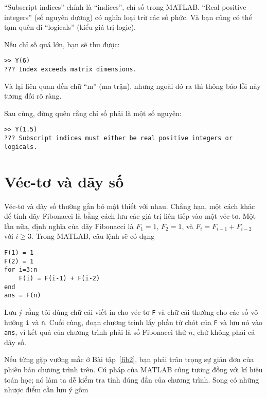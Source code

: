 \documentclass[12pt]{book}
\begin{document}
``Subscript indices'' chính là ``indices'', chỉ số trong MATLAB.
``Real positive integers'' (số nguyên dương) có nghĩa loại trừ
các số phức. Và bạn cũng có thể tạm quên đi ``logicals'' (kiểu
giá trị logic).

Nếu chỉ số quá lớn, bạn sẽ thu được:

\begin{verbatim}
>> Y(6)
??? Index exceeds matrix dimensions.
\end{verbatim}

Và lại liên quan đến chữ ``m'' (ma trận), nhưng ngoài đó ra thì
thông báo lỗi này tương đối rõ ràng.

Sau cùng, đừng quên rằng chỉ số phải là một số nguyên:

\begin{verbatim}
>> Y(1.5)
??? Subscript indices must either be real positive integers or
logicals.
\end{verbatim}


\section{Véc-tơ và dãy số}

Véc-tơ và dãy số thường gắn bó mật thiết với nhau. Chẳng hạn, một
cách khác để tính dãy Fibonacci là bằng cách lưu các giá trị liên
tiếp vào một véc-tơ. Một lần nữa, định nghĩa của dãy Fibonacci là
$F_1 = 1$, $F_2 = 1$, và $F_{i} = F_{i-1} +
F_{i-2}$ với $i \ge 3$.  Trong MATLAB, câu lệnh sẽ có dạng

\begin{verbatim}
F(1) = 1
F(2) = 1
for i=3:n
    F(i) = F(i-1) + F(i-2)
end
ans = F(n)
\end{verbatim}

Lưu ý rằng tôi dùng chữ cái viết in cho véc-tơ {\tt F}
và chữ cái thường cho các số vô hướng {\tt i} và {\tt n}.
Cuối cùng, đoạn chương trình lấy phần tử chót của {\tt F} và
lưu nó vào {\tt ans}, vì kết quả của chương trình phải là
số Fibonacci thứ $n$, chứ không phải cả dãy số.

Nếu từng gặp vướng mắc ở Bài tập~\ref{fib2}, bạn phải 
trân trọng sự giản đơn của phiên bản chương trình trên. 
Cú pháp của MATLAB cũng tương đồng với kí hiệu toán học; nó
làm ta dễ kiểm tra tính đúng đắn của chương trình. Song 
có những nhược điểm cần lưu ý gồm
\end{document}
